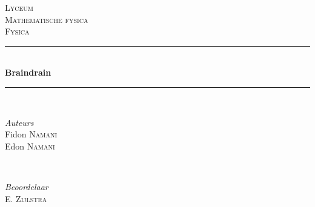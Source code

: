 \begin{titlepage} 
	\newcommand{\HRule}{\rule{\linewidth}{0.5mm}} %
	
	\center %
	
	
	\textsc{\LARGE Lyceum}\\[1.5cm] %
	
	\textsc{\Large Mathematische fysica}\\[0.5cm] %
	
	\textsc{\large Fysica}\\[0.5cm] %
	
	
	\HRule\\[0.4cm] %
	
	{\huge\bfseries Braindrain}\\[0.4cm] %
	
	\HRule\\[1.5cm]
	
	
	\begin{minipage}{0.4\textwidth}
		\begin{flushleft} %
			\large
			\textit{Auteurs}\\
			Fidon \textsc{Namani}\\ %
		    Edon \textsc{Namani}
		\end{flushleft}
	\end{minipage}
	~ %
	\begin{minipage}{0.4\textwidth}
		\begin{flushright} %
			\large
			\textit{Beoordelaar}\\
			 \textsc{E. Zijlstra} %
		\end{flushright}
	\end{minipage}



\end{titlepage}
